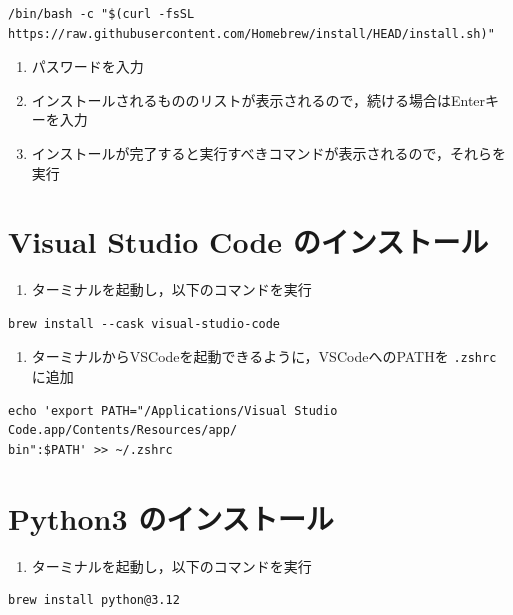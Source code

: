 \begin{lstlisting}[style=codecell]
    /bin/bash -c "$(curl -fsSL https://raw.githubusercontent.com/Homebrew/install/HEAD/install.sh)"
\end{lstlisting}


\begin{enumerate}
\item パスワードを入力
\item インストールされるもののリストが表示されるので，続ける場合はEnterキーを入力
\item インストールが完了すると実行すべきコマンドが表示されるので，それらを実行
\end{enumerate}


\section{Visual Studio Code のインストール}

\begin{enumerate}
\item ターミナルを起動し，以下のコマンドを実行
\end{enumerate}


\begin{lstlisting}[style=codecell]
    brew install --cask visual-studio-code
\end{lstlisting}

\begin{enumerate}
\item ターミナルからVSCodeを起動できるように，VSCodeへのPATHを \texttt{.zshrc} に追加
\end{enumerate}


\begin{lstlisting}[style=codecell]
    echo 'export PATH="/Applications/Visual Studio Code.app/Contents/Resources/app/
bin":$PATH' >> ~/.zshrc
\end{lstlisting}


\section{Python3 のインストール}

\begin{enumerate}
\item ターミナルを起動し，以下のコマンドを実行
\end{enumerate}


\begin{lstlisting}[style=codecell]
    brew install python@3.12
\end{lstlisting}


